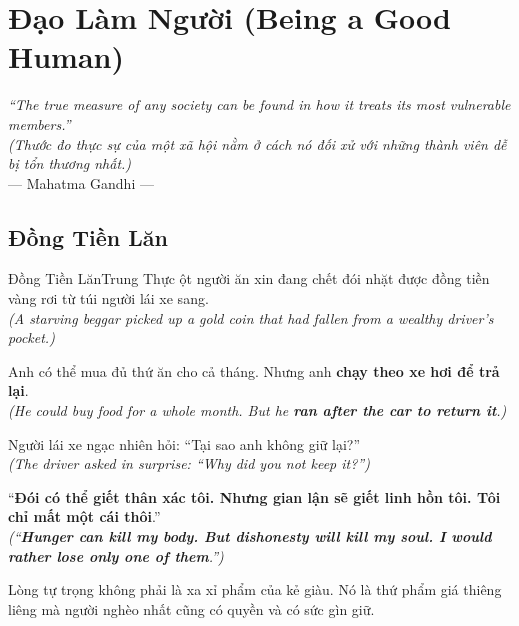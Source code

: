 \chapter{Đạo Làm Người (Being a Good Human)}

\begin{center}
  \textit{\color{truyenblue}``The true measure of any society can be found in how it treats its most vulnerable members.''}\\
  \textit{(Thước đo thực sự của một xã hội nằm ở cách nó đối xử với những thành viên dễ bị tổn thương nhất.)}\\[4pt]
  \small\color{truyengold}--- Mahatma Gandhi ---
\end{center}
\ngancach

\section{Đồng Tiền Lăn}
\begin{truyen}{Đồng Tiền Lăn}{Trung Thực}
ột người ăn xin đang chết đói nhặt được đồng tiền vàng rơi từ túi người lái xe sang.\\
\textit{(A starving beggar picked up a gold coin that had fallen from a wealthy driver's pocket.)}

Anh có thể mua đủ thứ ăn cho cả tháng. Nhưng anh \textbf{chạy theo xe hơi để trả lại}.\\
\textit{(He could buy food for a whole month. But he \textbf{ran after the car to return it}.)}

Người lái xe ngạc nhiên hỏi: ``Tại sao anh không giữ lại?''\\
\textit{(The driver asked in surprise: ``Why did you not keep it?'')}

``\textbf{Đói có thể giết thân xác tôi. Nhưng gian lận sẽ giết linh hồn tôi. Tôi chỉ mất một cái thôi}.''\\
\textit{(``\textbf{Hunger can kill my body. But dishonesty will kill my soul. I would rather lose only one of them}.'')}
\end{truyen}
\begin{baihoc}
  Lòng tự trọng không phải là xa xỉ phẩm của kẻ giàu. Nó là thứ phẩm giá thiêng liêng mà người nghèo nhất cũng có quyền và có sức gìn giữ.
\end{baihoc}


